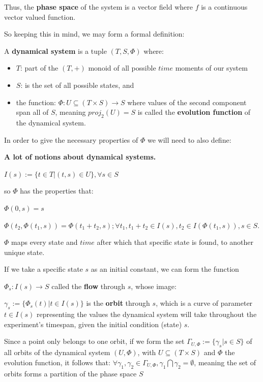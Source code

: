 Thus, the \textbf{phase space} of the system is a vector field where $f$ is a continuous vector valued function.

So keeping this in mind, we may form a formal definition:

\begin{definition}
	A \textbf{dynamical system} is a tuple $(T,S,\Phi)$ where:

	\begin{itemize}
		\item $T$: part of the $(T,+)$ monoid of all possible $time$ moments of our system
		\item $S$: is the set of all possible states, and
		\item the function: $\Phi : U \subseteq (T \times S ) \rightarrow S$ where values of the second component span all of $S$, meaning $proj_2(U) = S$ is called the \textbf{evolution function} of the dynamical system.
	\end{itemize}
	In order to give the necessary properties of $\Phi$ we will need to also define:
	\begin{definition}\label{dyn_sys_orbit_flow_etc_def}
		\textbf{A lot of notions about dynamical systems.} \cite{hale1996}

		$I(s):= \{ t \in T | (t,s) \in U \}, \forall s \in S$

		so $\Phi$ has the properties that:

		$\Phi(0,s) = s$

		$\Phi(t_2,\Phi(t_1,s)) = \Phi(t_1+t_2,s); \forall t_1, t_1+t_2 \in I(s), t_2 \in I(\Phi(t_1,s)), s \in S$.

		$\Phi$ maps every state and $time$ after which that specific state is found, to another unique state.
	\end{definition}

	If we take a specific state $s$ as an initial constant, we can form the function

	$\Phi_s : I(s) \rightarrow S$
	called the \textbf{flow} through $s$, whose image:

	$\gamma_s:=\{\Phi_s(t) | t\in I(s) \}$
	is the \textbf{orbit} through $s$,
	which is a curve of parameter $t \in I(s)$ representing the values the dynamical system will take throughout the experiment's timespan, given the initial condition (state) $s$.
\end{definition}

Since a point only belongs to one orbit, if we form the set
$\Gamma_{U,\Phi}:=\{ \gamma_s | s \in S \}$
of all orbits of the dynamical system $(U,\Phi)$, with $U\subseteq (T \times S)$ and $\Phi$ the evolution function, it follows that:
$\forall \gamma_1,\gamma_2 \in \Gamma_{U, \Phi}, \gamma_1 \bigcap \gamma_2 = \emptyset$, meaning the set of orbits forms a partition of the phase space $S$

